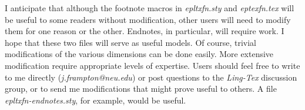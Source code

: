 I anticipate that although the footnote macros in {\sl epltxfn.sty\/}
and {\sl eptexfn.tex\/} will be useful to some readers without
modification, other users will need to modify them for one reason or
the other.  Endnotes, in particular, will require work.  I hope that
these two files will serve as useful models.  Of course, trivial
modifications of the various dimensions can be done easily.  More
extensive modification require appropriate levels of expertise.  Users
should feel free to write to me directly ({\sl j.frampton@neu.edu\/}) or
post questions to the {\sl Ling-Tex\/} discussion group, or to send me
modifications that might prove useful to others.  A file {\it
epltxfn-endnotes.sty}, for example, would be useful.


